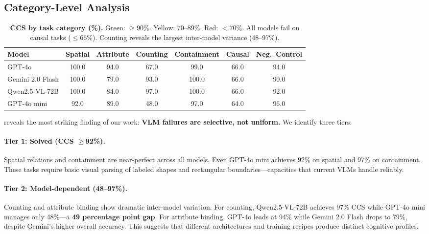 \documentclass[10pt,twocolumn,letterpaper]{article}
\newcommand{\ccs}{CCS\xspace}
\begin{document}
\subsection{Category-Level Analysis}

\begin{table}[t]
\centering
\caption{\textbf{\ccs by task category (\%).} \colorbox{green!15}{Green}: $\geq$90\%. \colorbox{yellow!25}{Yellow}: 70--89\%. \colorbox{red!15}{Red}: $<$70\%. All models fail on causal tasks ($\leq$66\%). Counting reveals the largest inter-model variance (48--97\%).}
\label{tab:category}
\small
\setlength{\tabcolsep}{5pt}
\begin{tabular}{@{}lcccccc@{}}
\toprule
Model & Spatial & Attribute & Counting & Containment & Causal & Neg.\ Control \\
\midrule
GPT-4o & \cellcolor{green!15}100.0 & \cellcolor{green!15}94.0 & \cellcolor{yellow!25}67.0 & \cellcolor{green!15}99.0 & \cellcolor{red!15}66.0 & \cellcolor{green!15}94.0 \\
Gemini 2.0 Flash & \cellcolor{green!15}100.0 & \cellcolor{yellow!25}79.0 & \cellcolor{green!15}93.0 & \cellcolor{green!15}100.0 & \cellcolor{red!15}66.0 & \cellcolor{green!15}90.0 \\
Qwen2.5-VL-72B & \cellcolor{green!15}100.0 & \cellcolor{yellow!25}84.0 & \cellcolor{green!15}97.0 & \cellcolor{green!15}100.0 & \cellcolor{red!15}66.0 & \cellcolor{green!15}92.0 \\
GPT-4o mini & \cellcolor{green!15}92.0 & \cellcolor{yellow!25}89.0 & \cellcolor{red!15}48.0 & \cellcolor{green!15}97.0 & \cellcolor{red!15}64.0 & \cellcolor{green!15}96.0 \\
\bottomrule
\end{tabular}
\end{table}

 reveals the most striking finding of our work: \textbf{VLM failures are selective, not uniform.} We identify three tiers:

\paragraph{Tier 1: Solved (CCS $\geq$92\%).} Spatial relations and containment are near-perfect across all models. Even GPT-4o mini achieves 92\% on spatial and 97\% on containment. These tasks require basic visual parsing of labeled shapes and rectangular boundaries---capacities that current VLMs handle reliably.

\paragraph{Tier 2: Model-dependent (48--97\%).} Counting and attribute binding show dramatic inter-model variation. For counting, Qwen2.5-VL-72B achieves 97\% \ccs while GPT-4o mini manages only 48\%---a \textbf{49 percentage point gap}. For attribute binding, GPT-4o leads at 94\% while Gemini 2.0 Flash drops to 79\%, despite Gemini's higher overall accuracy. This suggests that different architectures and training recipes produce distinct cognitive profiles.
\end{document}
